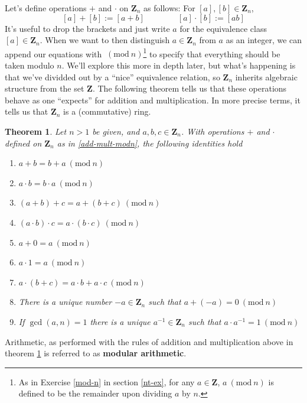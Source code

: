 \documentclass[12pt]{article}
\numberwithin{equation}{subsection}
\newtheorem{thm}[subsection]{Theorem}
\theoremstyle{note}
\newcommand{\Mod}[1]{\ (\mathrm{mod}\ #1)}
\begin{document}
	Let's define operations $+$ and $\cdot$ on $\mathbf{Z}_n$ as follows: For $[a],[b]\in\mathbf{Z}_n$, \begin{equation} \label{add-mult-modn} [a]+[b]:=[a+b] \qquad \qquad  [a]\cdot [b]:=[ab]\end{equation} 
It's useful to drop the brackets and just write $a$ for the equivalence class $[a]\in\mathbf{Z}_n$. When we want to then distinguish $a\in\mathbf{Z}_n$ from $a$ as an integer, we can append our equations with $\Mod{n}$\footnote{As in Exercise \ref{mod-n} in section \ref{nt-ex}, for any $a\in\mathbf{Z}$, $a\Mod{n}$ is defined to be the remainder upon dividing $a$ by $n$.} to specify that everything should be taken modulo $n$. We'll explore this more in depth later, but what's happening is that we've dividded out by a ``nice'' equivalence relation, so $\mathbf{Z}_n$ inherits algebraic structure from the set $\mathbf{Z}$. The following theorem tells us that these operations behave as one ``expects'' for addition and multiplication. In more precise terms, it tells us that $\mathbf{Z}_n$ is a (commutative) ring. 




\begin{thm} \label{mod-n-ar}
	Let $n>1$ be given, and $a,b,c\in\mathbf{Z}_n$. With operations $+$ and $\cdot$ defined on $\mathbf{Z}_n$ as in \eqref{add-mult-modn},  the following identities hold
	\begin{enumerate}
		\item $a+b=b+a\Mod{n}$
		\item $a\cdot b=b\cdot a \Mod{n}$
		\item $(a+b)+c=a+(b+c)\Mod{n}$
		\item $(a\cdot b)\cdot c=a\cdot (b\cdot c)\Mod{n}$
		\item $a+0=a\Mod{n}$
		\item $a\cdot 1=a\Mod{n}$
		\item $a\cdot(b+c)=a\cdot b+a\cdot c\Mod{n}$
		\item There is a unique number $-a\in\mathbf{Z}_n$ such that $a+(-a)=0\Mod{n}$
		\item If $\gcd(a,n)=1$ there is a unique $a^{-1}\in\mathbf{Z}_n$ such that $a\cdot a^{-1}=1\Mod{n}$
	\end{enumerate}
\end{thm}

Arithmetic, as performed with the rules of addition and multiplication above in theorem \ref{mod-n-ar} is referred to as \textbf{modular arithmetic}.
\end{document}
